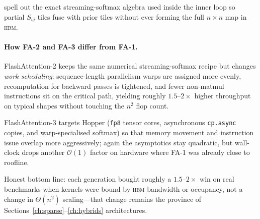 \noindent
\citet{dao2022flashattention} spell out the exact streaming-softmax algebra used
inside the inner loop so partial \(S_{ij}\) tiles fuse with prior tiles without
ever forming the full \(n\times n\) map in \textsc{hbm}.

\paragraph{How FA-2 and FA-3 differ from FA-1.}
FlashAttention-2 \citep{dao2023fa2} keeps the same numerical streaming-softmax
recipe but changes \emph{work scheduling}: sequence-length parallelism warps are
assigned more evenly, recomputation for backward passes is tightened, and fewer
non-matmul instructions sit on the critical path, yielding roughly
\(1.5\)--\(2\times\) higher throughput on typical shapes without touching the
\(n^{2}\) flop count.

FlashAttention-3 \citep{shah2024fa3} targets Hopper (\texttt{fp8} tensor cores,
asynchronous \texttt{cp.async} copies, and warp-specialised softmax) so that
memory movement and instruction issue overlap more aggressively; again the
asymptotics stay quadratic, but wall-clock drops another \(\mathcal{O}(1)\)
factor on hardware where FA-1 was already close to roofline.

Honest bottom line: each generation bought roughly a \(1.5\)--\(2\times\) win on
real benchmarks when kernels were bound by \textsc{hbm} bandwidth or occupancy,
not a change in \(\Theta(n^{2})\) scaling---that change remains the province of
Sections~\ref{ch:sparse}--\ref{ch:hybrids} architectures.
